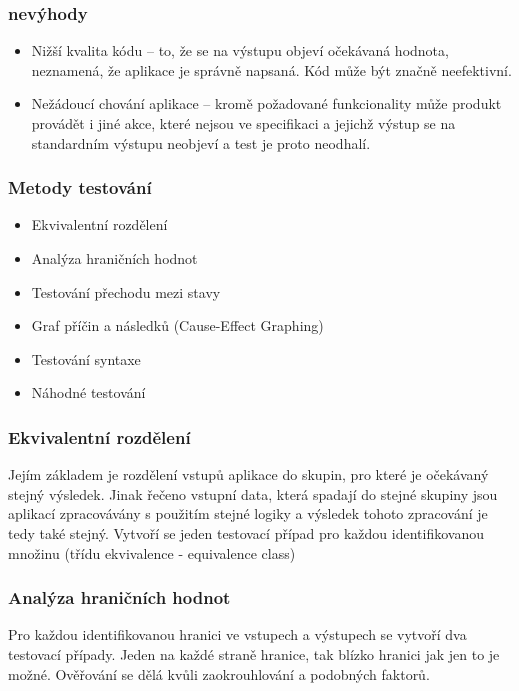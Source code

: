 \documentclass{article}
\begin{document}
\subsubsection{nevýhody}
\begin{itemize}
    \item Nižší kvalita kódu – to, že se na výstupu objeví očekávaná hodnota, neznamená, že aplikace je správně napsaná. Kód může být značně neefektivní.
    \item Nežádoucí chování aplikace – kromě požadované funkcionality může produkt provádět i jiné akce, které nejsou ve specifikaci a jejichž výstup se na standardním výstupu neobjeví a test je proto neodhalí.
\end{itemize}
\subsubsection{Metody testování}
\begin{itemize}
    \item Ekvivalentní rozdělení
    \item Analýza hraničních hodnot
    \item Testování přechodu mezi stavy
    \item Graf příčin a následků (Cause-Effect Graphing)
    \item Testování syntaxe
    \item Náhodné testování
\end{itemize}
\subsubsection{Ekvivalentní rozdělení}
Jejím základem je rozdělení vstupů aplikace do skupin, pro které je očekávaný stejný výsledek. Jinak řečeno vstupní data, která spadají do stejné skupiny jsou aplikací zpracovávány s použitím stejné logiky a výsledek tohoto zpracování je tedy také stejný.
\newline
Vytvoří se jeden testovací případ pro každou identifikovanou množinu (třídu ekvivalence - equivalence class)
\subsubsection{Analýza hraničních hodnot}
Pro každou identifikovanou hranici ve vstupech a výstupech se vytvoří dva testovací případy. Jeden na každé straně hranice, tak blízko hranici jak jen to je možné. Ověřování se dělá kvůli zaokrouhlování a podobných faktorů.
\end{document}

